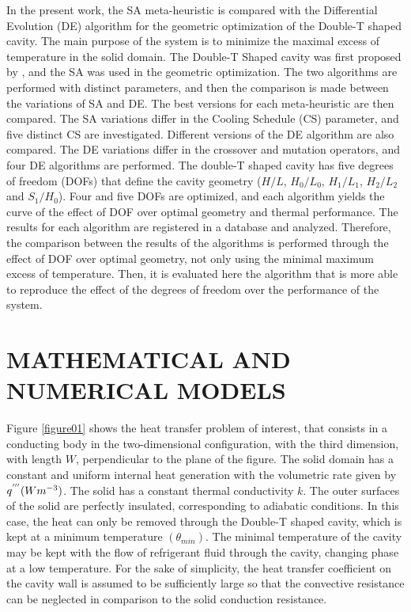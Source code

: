\documentclass[12pt,fleqn]{article}
\begin{document}
In the present work, the SA meta-heuristic is compared with the Differential Evolution (DE) algorithm for the geometric optimization of the Double-T shaped cavity. The main purpose of the system is to minimize the maximal excess of temperature in the solid domain. The Double-T Shaped cavity was first proposed by \cite{Gonzales2015b}, and the SA was used in the geometric optimization. The two algorithms are performed with distinct parameters, and then the comparison is made between the variations of SA and DE. The best versions for each meta-heuristic are then compared. The SA variations differ in the Cooling Schedule (CS) parameter, and five distinct CS are investigated. Different versions of the DE algorithm are also compared. The DE variations differ in the crossover and mutation operators, and four DE algorithms are performed. The double-T shaped cavity has five degrees of freedom (DOFs) that define the cavity geometry ($H/L$, $H_{0}/L_{0}$, $H_{1}/L_{1}$, $H_{2}/L_{2}$ and $S_{1}/H_{0}$). Four and five DOFs are optimized, and each algorithm yields the curve of the effect of DOF over optimal geometry and thermal performance. The results for each algorithm are registered in a database and analyzed. Therefore, the comparison between the results of the algorithms is performed through the effect of DOF over optimal geometry, not only using the minimal maximum excess of temperature.  Then, it is evaluated here the algorithm that is more able to reproduce the effect of the degrees of freedom over the performance of the system.

\section{MATHEMATICAL AND NUMERICAL MODELS}


Figure \ref{figure01} shows the heat transfer problem of interest, that consists in a conducting body in the two-dimensional configuration, with the third dimension, with length $W$, perpendicular to the plane of the figure. The solid domain has a constant and uniform internal heat generation with the volumetric rate given by $q^{'''}(Wm^{\tiny -3})$. The solid has a constant thermal conductivity $k$. The outer surfaces of the solid are perfectly insulated, corresponding to adiabatic conditions. In this case, the heat can only be removed through the Double-T shaped cavity, which is kept at a minimum temperature $(\theta_{min})$. The minimal temperature of the cavity may be kept with the flow of refrigerant fluid through the cavity, changing phase at a low temperature. For the sake of simplicity, the heat transfer coefficient on the cavity wall is assumed to be sufficiently large so that the convective resistance can be neglected in comparison to the solid conduction resistance.
\end{document}
